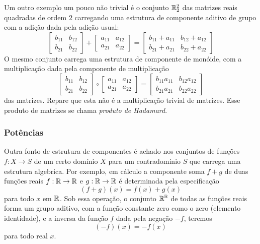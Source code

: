 Um outro exemplo um pouco não trivial é o conjunto $\mathbb{R}_{2}^{2}$ das matrizes reais quadradas de ordem $2$ carregando uma estrutura de componente aditivo de grupo com a adição dada pela adição usual:
$$\begin{bmatrix}
  b_{11} & b_{12}\\
  b_{21} & b_{22}
\end{bmatrix} +
\begin{bmatrix}
  a_{11} & a_{12}\\
  a_{21} & a_{22}
\end{bmatrix} =
\begin{bmatrix}
  b_{11} + a_{11} & b_{12} + a_{12}\\
  b_{21} + a_{21} & b_{22} + a_{22}
\end{bmatrix}
$$
O mesmo conjunto carrega uma estrutura de componente de monóide, com a multiplicação dada pela componente de multiplicação
$$\begin{bmatrix}
  b_{11} & b_{12}\\
  b_{21} & b_{22}
\end{bmatrix} \circ
\begin{bmatrix}
  a_{11} & a_{12}\\
  a_{21} & a_{22}
\end{bmatrix} =
\begin{bmatrix}
  b_{11}a_{11} & b_{12}a_{12}\\
  b_{21}a_{21} & b_{22}a_{22}
\end{bmatrix}
$$
das matrizes. Repare que esta não é a multiplicação trivial de matrizes. Esse produto de matrizes se chama \emph{produto de Hadamard}.

\subsubsection{Potências}
Outra fonto de estrutura de componentes é achado nos conjuntos de funções $f: X\to S$ de um certo domínio $X$ para um contradomínio $S$ que carrega uma estrutura algebrica. Por exemplo, em cálculo a componente soma $f + g$ de duas funções reais $f: \mathbb{R} \to \mathbb{R}$ e $g: \mathbb{R} \to \mathbb{R}$ é determinada pela especificação
$$(f+g)(x)=f(x)+g(x)$$ para todo $x$ em $\mathbb{R}$. Sob essa operação, o conjunto $\mathbb{R}^{\mathbb{R}}$ de todas as funções reais forma um grupo aditivo, com a função constante zero como o zero (elemento identidade), e a inversa da função $f$ dada pela negação $-f$, teremos
$$(-f)(x) = -f(x)$$ para todo real $x$.


